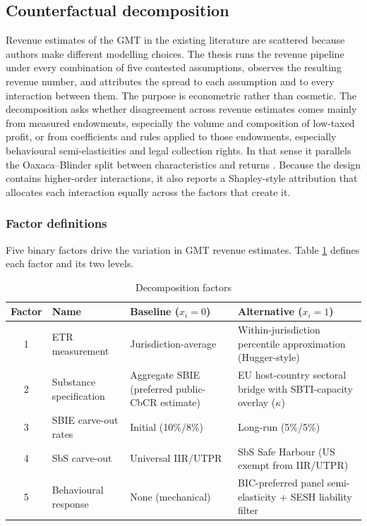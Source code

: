 \documentclass[11pt,a4paper]{article}
\begin{document}
\subsection{Counterfactual decomposition}\label{sec:decomposition}

Revenue estimates of the GMT in the existing literature are scattered because authors make different modelling choices. The thesis runs the revenue pipeline under every combination of five contested assumptions, observes the resulting revenue number, and attributes the spread to each assumption and to every interaction between them. The purpose is econometric rather than cosmetic. The decomposition asks whether disagreement across revenue estimates comes mainly from measured endowments, especially the volume and composition of low-taxed profit, or from coefficients and rules applied to those endowments, especially behavioural semi-elasticities and legal collection rights. In that sense it parallels the Oaxaca--Blinder split between characteristics and returns \citep{oaxaca1973,blinder1973}. Because the design contains higher-order interactions, it also reports a Shapley-style attribution that allocates each interaction equally across the factors that create it.

\subsubsection{Factor definitions}\label{sec:factors}

Five binary factors drive the variation in GMT revenue estimates. Table \ref{tab:factors} defines each factor and its two levels.

\begin{table}[H]
\centering
\caption{Decomposition factors}
\label{tab:factors}
\small
\begin{tabular}{@{}clp{3.5cm}p{3.5cm}@{}}
\toprule
Factor & Name & Baseline ($x_i = 0$) & Alternative ($x_i = 1$) \\
\midrule
1 & ETR measurement & Jurisdiction-average & Within-jurisdiction percentile approximation (Hugger-style) \\
2 & Substance specification & Aggregate SBIE (preferred public-CbCR estimate) & EU host-country sectoral bridge with SBTI-capacity overlay ($\kappa$) \\
3 & SBIE carve-out rates & Initial (10\%/8\%) & Long-run (5\%/5\%) \\
4 & SbS carve-out & Universal IIR/UTPR & SbS Safe Harbour (US exempt from IIR/UTPR) \\
5 & Behavioural response & None (mechanical) & BIC-preferred panel semi-elasticity + SESH liability filter \\
\bottomrule
\end{tabular}
\end{table}
\end{document}
